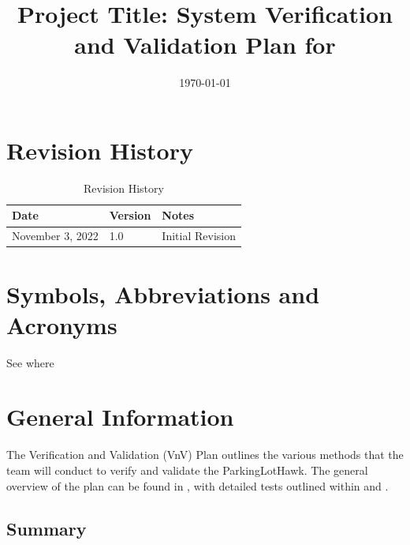 \documentclass[12pt, titlepage]{article}
\begin{document}
\title{Project Title: System Verification and Validation Plan for \progname{}} 
\author{\authname}
\date{\today}
	
\maketitle


\section{Revision History}

\begin{table}[hp]
\caption{Revision History} \label{TblRevisionHistory}
\begin{tabularx}{\textwidth}{llX}
\toprule
\toprule {\bf Date} & {\bf Version} & {\bf Notes}\\
\midrule
November 3, 2022 & 1.0 & Initial Revision \\
\bottomrule
\end{tabularx}
\end{table}

\newpage

\tableofcontents

\listoftables

\listoffigures

\newpage

\section{Symbols, Abbreviations and Acronyms}
  
See where 

\newpage


\section{General Information}

The Verification and Validation (VnV) Plan outlines the various methods that the team will conduct to verify and validate the ParkingLotHawk. The general overview of the plan can be found in , with detailed tests outlined within  and .

\subsection{Summary}
\end{document}
